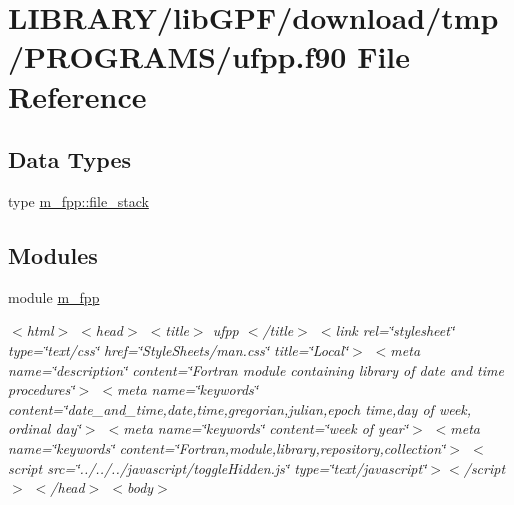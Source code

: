 \hypertarget{ufpp_8f90}{}\section{L\+I\+B\+R\+A\+R\+Y/lib\+G\+P\+F/download/tmp/\+P\+R\+O\+G\+R\+A\+M\+S/ufpp.f90 File Reference}
\label{ufpp_8f90}
\subsection*{Data Types}
\begin{DoxyCompactItemize}
\item 
type \hyperlink{structm__fpp_1_1file__stack}{m\+\_\+fpp\+::file\+\_\+stack}
\end{DoxyCompactItemize}
\subsection*{Modules}
\begin{DoxyCompactItemize}
\item 
module \hyperlink{namespacem__fpp}{m\+\_\+fpp}
\begin{DoxyCompactList}\small\item\em $<$html$>$ $<$head$>$ $<$title$>$ ufpp $<$/title$>$ $<$link rel=\char`\"{}stylesheet\char`\"{} type=\char`\"{}text/css\char`\"{} href=\char`\"{}\+Style\+Sheets/man.\+css\char`\"{} title=\char`\"{}\+Local\char`\"{}$>$ $<$meta name=\char`\"{}description\char`\"{} content=\char`\"{}\+Fortran module containing library of date and time procedures\char`\"{}$>$ $<$meta name=\char`\"{}keywords\char`\"{} content=\char`\"{}date\+\_\+and\+\_\+time,date,time,gregorian,julian,epoch time,day of week, ordinal day\char`\"{}$>$ $<$meta name=\char`\"{}keywords\char`\"{} content=\char`\"{}week of year\char`\"{}$>$ $<$meta name=\char`\"{}keywords\char`\"{} content=\char`\"{}\+Fortran,module,library,repository,collection\char`\"{}$>$ $<$script src=\char`\"{}../../../javascript/toggle\+Hidden.\+js\char`\"{} type=\char`\"{}text/javascript\char`\"{}$>$$<$/script$>$ $<$/head$>$ $<$body$>$

\href{../../../GPF.html}{\tt }\end{DoxyCompactList}\end{DoxyCompactItemize}

